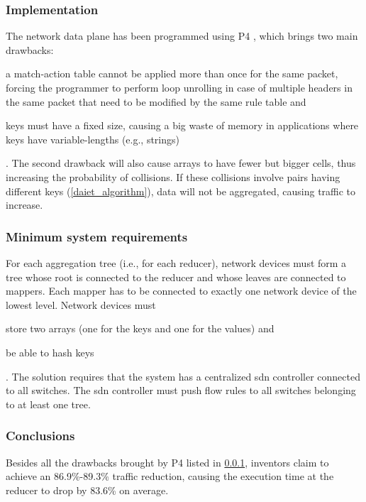 \subsubsection{Implementation} \label{daiet_implementation} \label{p4_drawbacks}
The network data plane has been programmed using P4 \cite{p4}, which brings two main drawbacks:
\begin{mylist}
    \item a match-action table cannot be applied more than once for the same packet, forcing the programmer to perform loop unrolling in case of multiple headers in the same packet that need to be modified by the same rule table and
    \item keys must have a fixed size, causing a big waste of memory in applications where keys have variable-lengths (e.g., strings)
\end{mylist}.
The second drawback will also cause arrays to have fewer but bigger cells, thus increasing the probability of collisions.
If these collisions involve pairs having different keys (\cref{daiet_algorithm}), data will not be aggregated, causing traffic to increase.

\subsubsection{Minimum system requirements}
For each aggregation tree (i.e., for each reducer), network devices must form a tree whose root is connected to the reducer and whose leaves are connected to mappers.
Each mapper has to be connected to exactly one network device of the lowest level.
Network devices must
\begin{mylist}
    \item store two arrays (one for the keys and one for the values) and
    \item be able to hash keys
\end{mylist}.
The solution requires that the system has a centralized \gls{sdn} controller connected to all switches.
The \gls{sdn} controller must push flow rules to all switches belonging to at least one tree.

\subsubsection{Conclusions}
Besides all the drawbacks brought by P4 \cite{p4} listed in \cref{daiet_implementation}, inventors claim to achieve an 86.9\%-89.3\% traffic reduction, causing the execution time at the reducer to drop by 83.6\% on average.